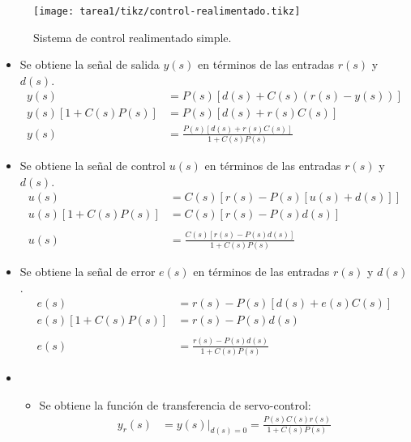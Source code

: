   \begin{ejercicio}
    \begin{figure}[H]
        \centering
        \texttt{[image: tarea1/tikz/control-realimentado.tikz]}
        \caption{Sistema de control realimentado simple.}
        \label{img:ejercicio1}
    \end{figure}
  \end{ejercicio}
  \begin{itemize}
    \item 
    Se obtiene la señal de salida $y(s)$ en términos de las entradas $r(s)$ y $d(s)$.
    \begin{align*}
      y(s) &= P(s) \left[ d(s) + C(s) \left( r(s) - y(s) \right) \right]
      \\
      y(s) \left[ 1 + C(s) P(s) \right] &= P(s) \left[ d(s) + r(s) C(s) \right]
      \\
      y(s) &= \frac{P(s) \left[ d(s) + r(s) C(s) \right]}{1 + C(s) P(s)}
    \end{align*}

    \item
    Se obtiene la señal de control $u(s)$ en términos de las entradas $r(s)$ y $d(s)$.
    \begin{align*}
      u(s) &= C(s) \left[ r(s) - P(s) \left[ u(s) + d(s) \right] \right]
      \\
      u(s) \left[ 1 + C(s) P(s) \right] &= C(s) \left[ r(s) - P(s) d(s) \right]
      \\ \\
      u(s) &= \frac{C(s) \left[ r(s) - P(s) d(s) \right]}{1 + C(s) P(s)}
    \end{align*}

    \item
    Se obtiene la señal de error $e(s)$ en términos de las entradas $r(s)$ y $d(s)$.
    \begin{align*}
      e(s) &= r(s) - P(s) \left[ d(s) + e(s) C(s) \right]
      \\
      e(s) \left[ 1 + C(s) P(s) \right] &= r(s) - P(s) d(s)
      \\ \\
      e(s) &= \frac{r(s) - P(s) d(s)}{1 + C(s) P(s)}
    \end{align*}

    \item
    \begin{itemize}

      \item 
      Se obtiene la función de transferencia de servo-control:
      \begin{align*}
        y_{r}(s) &= y(s)|_{d(s)=0} = \frac{P(s) C(s) r(s)}{1 + C(s) P(s)}
      \end{align*}


\end{itemize}
\end{itemize}
